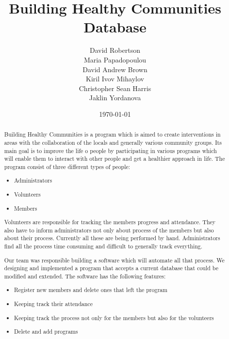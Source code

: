 \documentclass{l3proj}
\begin{document}
\title{Building Healthy Communities Database}

\author{David Robertson \\
Maria Papadopoulou \\
David Andrew Brown \\
Kiril Ivov Mihaylov \\
Christopher Sean Harris \\
Jaklin Yordanova}

\date{\today}

\maketitle

\begin{abstract}

Building Healthy Communities is a program which is aimed to create interventions in areas with the collaboration of the locals and generally various community groups. Its main goal is to improve the life o people by participating in various programs which will enable them to interact with other people and get a healthier approach in life. The program consist of three different types of people:
\begin{itemize}
	\item Administrators
	\item Volunteers
	\item Members
\end{itemize}
Volunteers are responsible for tracking the members progress and attendance. They also have to inform administrators not only about process of the members but also about their process. Currently all these are being performed by hand. Administrators find all the process time consuming and difficult to generally track everything. 

Our team was responsible building a software which will automate all that process. We designing and implemented a program that accepts a current database that could be modified and extended. The software has the following features:
\begin{itemize}
	\item Register new members and delete ones that left the program
	\item Keeping track their attendance
	\item Keeping track the process not only  for the members but also for the volunteers
	\item Delete and add programs
\end{itemize} 

\end{abstract}
\end{document}
